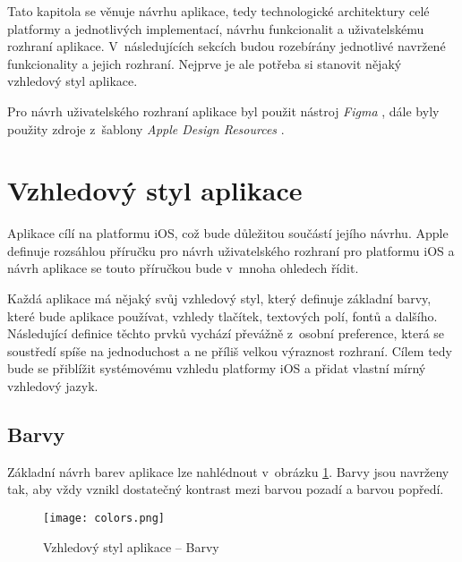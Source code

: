 Tato kapitola se věnuje návrhu aplikace, tedy technologické architektury celé platformy a jednotlivých implementací, návrhu funkcionalit a uživatelskému rozhraní aplikace. V~následujících sekcích budou rozebírány jednotlivé navržené funkcionality a jejich rozhraní. Nejprve je ale potřeba si stanovit nějaký vzhledový styl aplikace.

Pro návrh uživatelského rozhraní aplikace byl použit nástroj \emph{Figma} \cite{figma}, dále byly použity zdroje z~šablony \emph{Apple Design Resources} \cite{apple-design-resources}.

\section{Vzhledový styl aplikace}

Aplikace cílí na platformu iOS, což bude důležitou součástí jejího návrhu. Apple definuje rozsáhlou příručku pro návrh uživatelského rozhraní pro platformu iOS \cite{apple-design-guidelines-ios} a návrh aplikace se touto příručkou bude v~mnoha ohledech řídit.

Každá aplikace má nějaký svůj vzhledový styl, který definuje základní barvy, které bude aplikace používat, vzhledy tlačítek, textových polí, fontů a dalšího. Následující definice těchto prvků vychází převážně z~osobní preference, která se soustředí spíše na jednoduchost a ne příliš velkou výraznost rozhraní. Cílem tedy bude se přiblížit systémovému vzhledu platformy iOS a přidat vlastní mírný vzhledový jazyk.

\subsection{Barvy}

Základní návrh barev aplikace lze nahlédnout v~obrázku \ref{fig:colors}. Barvy jsou navrženy tak, aby vždy vznikl dostatečný kontrast mezi barvou pozadí a barvou popředí.

\begin{figure}[h]
	\centering
	\texttt{[image: colors.png]}
	\caption{Vzhledový styl aplikace – Barvy}
	\label{fig:colors}
\end{figure}

